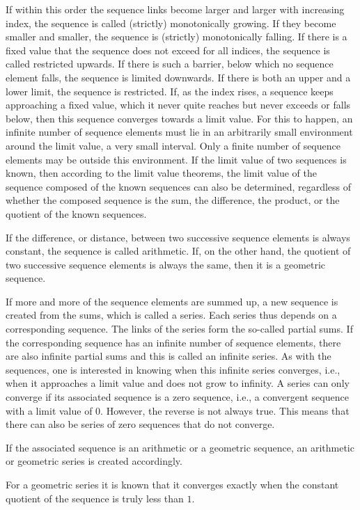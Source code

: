 \documentclass{book}
\begin{document}
If within this order the sequence links become larger and larger with increasing index, the sequence is called (strictly) monotonically growing. If they become smaller and smaller, the sequence is (strictly) monotonically falling. If there is a fixed value that the sequence does not exceed for all indices, the sequence is called restricted upwards. If there is such a barrier, below which no sequence element falls, the sequence is limited downwards. If there is both an upper and a lower limit, the sequence is restricted. If, as the index rises, a sequence keeps approaching a fixed value, which it never quite reaches but never exceeds or falls below, then this sequence converges towards a limit value. For this to happen, an infinite number of sequence elements must lie in an arbitrarily small environment around the limit value, a very small interval. Only a finite number of sequence elements may be outside this environment. If the limit value of two sequences is known, then according to the limit value theorems, the limit value of the sequence composed of the known sequences can also be determined, regardless of whether the composed sequence is the sum, the difference, the product, or the quotient of the known sequences.

If the difference, or distance, between two successive sequence elements is always constant, the sequence is called arithmetic. If, on the other hand, the quotient of two successive sequence elements is always the same, then it is a geometric sequence.

If more and more of the sequence elements are summed up, a new sequence is created from the sums, which is called a series. Each series thus depends on a corresponding sequence. The links of the series form the so-called partial sums. If the corresponding sequence has an infinite number of sequence elements, there are also infinite partial sums and this is called an infinite series. As with the sequences, one is interested in knowing when this infinite series converges, i.e., when it approaches a limit value and does not grow to infinity. A series can only converge if its associated sequence is a zero sequence, i.e., a convergent sequence with a limit value of $0$. However, the reverse is not always true. This means that there can also be series of zero sequences that do not converge.

If the associated sequence is an arithmetic or a geometric sequence, an arithmetic or geometric series is created accordingly.

For a geometric series it is known that it converges exactly when the constant quotient of the sequence is truly less than $1$.
\end{document}
